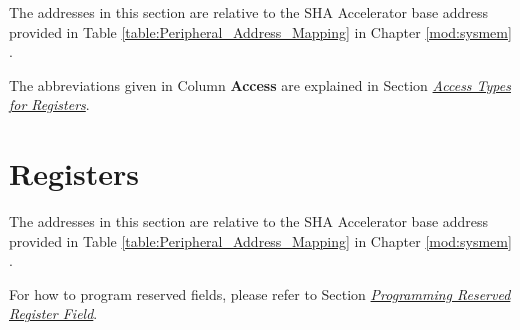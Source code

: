 \documentclass[main\_\_EN.tex]{subfiles}
\begin{document}
The addresses in this section are relative to the SHA Accelerator base address provided in Table \ref{table:Peripheral_Address_Mapping} in Chapter \ref{mod:sysmem} \textit{}.

The abbreviations given in Column \textbf{Access} are explained in Section \hyperref[glossary-access-types]{\textit{Access Types for Registers}}.



\newpage

\section{Registers}

The addresses in this section are relative to the SHA Accelerator base address provided in Table \ref{table:Peripheral_Address_Mapping} in Chapter \ref{mod:sysmem} \textit{}.

For how to program reserved fields, please refer to Section \hyperref[programming-reserved-field]{\textit{Programming Reserved Register Field}}.


\end{document}
